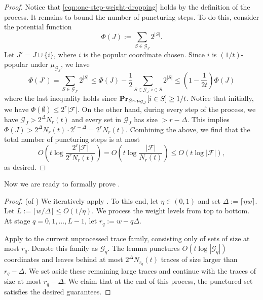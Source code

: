 \documentclass{article}
\renewcommand{\Pr}{\mathop{\bf Pr\/}}
\newcommand{\<}{\langle}
\renewcommand{\>}{\rangle}
\newcommand{\calF}{\mathcal{F}}
\newcommand{\calG}{\mathcal{G}}
\begin{document}
{\begin{proof}
    Notice that \eqref{eqn:one-step-weight-dropping} holds by the definition of the process. It remains to bound the number of puncturing steps. To do this, consider the potential function
    \[
    \Phi (J):= \sum_{S \in \calG_J}2^{|S|}.
    \]
    Let $J' = J \cup \{i\}$, where $i$ is the popular coordinate chosen. Since $i$ is $(1/t)$-popular under $\mu_{\calG_J}$, we have
    \[
    \Phi (J') = \sum_{S \in \calG_{J'}}2^{|S|} \leq \Phi(J) - \frac{1}{2}\sum_{S \in \calG_J: i \in S}2^{|S|} \leq \left(1 - \frac{1}{2t}\right) \Phi (J)
    \]
    where the last inequality holds since $\Pr_{S \sim \mu_{\calG_J}}[i \in S] \geq 1/t$. Notice that initially, we have $\Phi (\emptyset) \leq 2^{r}|\calF|$. On the other hand,  during every step of the process, we have $\calG_J > 2^{\Delta}N_r(t)$ and every set in $\calG_J$ has size $> r - \Delta$. This implies $\Phi (J) > 2^{\Delta} N_r (t) \cdot 2^{r- \Delta} = 2^r N_r (t)$. Combining the above, we find that the total number of puncturing steps is at most 
    \[
    O \left(t \log \frac{2^r |\calF|}{2^r N_r (t)} \right) = O \left(t \log \frac{|\calF|}{N_r(t)} \right) \leq O(t \log |\calF|),
    \]
    as desired.
\end{proof}

Now we are ready to formally prove . 

\begin{proof}
    (of ) We iteratively apply . To this end, let $\eta \in (0,1)$ and set $\Delta:= \lceil \eta w \rceil$. Let $L:= \lceil w / \Delta \rceil \leq O(1/ \eta)$. We process the weight levels from top to bottom. At stage $q = 0,1,\ldots,L-1$, let $r_q:= w - q \Delta$. 

    Apply  to the current unprocessed trace family, consisting only of sets of size at most $r_q$. Denote this family as $\calG_q$. The lemma punctures $O(t \log |\calG_q|)$ coordinates and leaves behind at most $2^{\Delta}N_{r_q}(t)$ traces of size larger than $r_q - \Delta$. We set aside these remaining large traces and continue with the traces of size at most $r_q - \Delta$. We claim that at the end of this process, the punctured set satisfies the desired guarantees.


\end{proof}}
\end{document}
